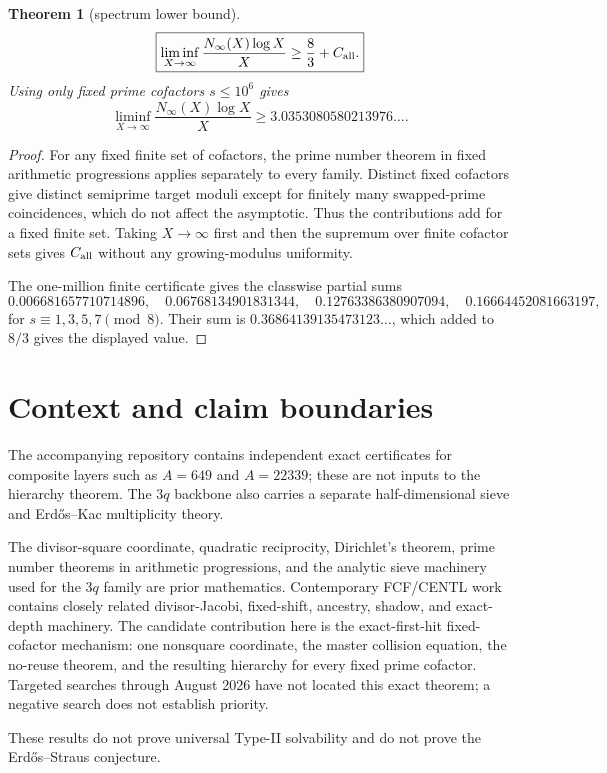 \documentclass[11pt]{article}
\newtheorem{theorem}{Theorem}
\theoremstyle{definition}
\begin{document}
\begin{theorem}[spectrum lower bound]\label{thm:count}
\[
\boxed{\liminf_{X\to\infty}\frac{N_\infty(X)\log X}{X}\ge\frac83+C_{\rm all}.}
\]
Using only fixed prime cofactors $s\le10^6$ gives
\[
\boxed{\liminf_{X\to\infty}\frac{N_\infty(X)\log X}{X}\ge3.0353080580213976\ldots .}
\]
\end{theorem}

\begin{proof}
For any fixed finite set of cofactors, the prime number theorem in fixed arithmetic progressions applies separately to every family. Distinct fixed cofactors give distinct semiprime target moduli except for finitely many swapped-prime coincidences, which do not affect the asymptotic. Thus the contributions add for a fixed finite set. Taking $X\to\infty$ first and then the supremum over finite cofactor sets gives $C_{\rm all}$ without any growing-modulus uniformity.

The one-million finite certificate gives the classwise partial sums
\[
0.006681657710714896,\quad0.06768134901831344,\quad0.12763386380907094,\quad0.16664452081663197,
\]
for $s\equiv1,3,5,7\pmod8$. Their sum is $0.36864139135473123\ldots$, which added to $8/3$ gives the displayed value.
\end{proof}

\section{Context and claim boundaries}
The accompanying repository contains independent exact certificates for composite layers such as $A=649$ and $A=22339$; these are not inputs to the hierarchy theorem. The $3q$ backbone also carries a separate half-dimensional sieve and Erd\H{o}s--Kac multiplicity theory.

The divisor-square coordinate, quadratic reciprocity, Dirichlet's theorem, prime number theorems in arithmetic progressions, and the analytic sieve machinery used for the $3q$ family are prior mathematics. Contemporary FCF/CENTL work contains closely related divisor-Jacobi, fixed-shift, ancestry, shadow, and exact-depth machinery. The candidate contribution here is the exact-first-hit fixed-cofactor mechanism: one nonsquare coordinate, the master collision equation, the no-reuse theorem, and the resulting hierarchy for every fixed prime cofactor. Targeted searches through August 2026 have not located this exact theorem; a negative search does not establish priority.

These results do not prove universal Type-II solvability and do not prove the Erd\H{o}s--Straus conjecture.
\end{document}
